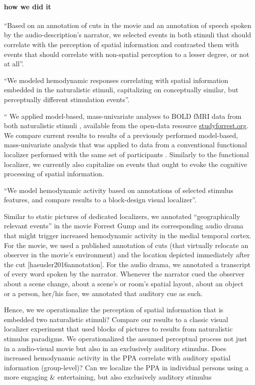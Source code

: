 \paragraph{how we did it}

%
``Based on an annotation of cuts in the movie and an annotation of speech spoken
by the audio-description's narrator, we selected events in both stimuli that
should correlate with the perception of spatial information and contrasted them
with events that should correlate with non-spatial perception to a lesser
degree, or not at all''.

``We modeled hemodynamic responses correlating with spatial information embedded
in the naturalistic stimuli, capitalizing on conceptually similar, but
perceptually different stimulation events''.

``%
We applied model-based, mass-univariate analyses to BOLD fMRI data from both
naturalistic stimuli \citep{hanke2016simultaneous, hanke2014audiomovie},
available from the open-data resource
\href{http://www.studyforrest.org}{studyforrest.org}.
We compare current results to results of a previously performed model-based,
mass-univariate analysis that was applied to data from a conventional functional
localizer performed with the same set of participants
\citep{sengupta2016extension}.
Similarly to the functional localizer, we currently also capitalize on events
that ought to evoke the cognitive processing of spatial information.

``We model hemodynamic activity based on annotations of selected stimulus
features,
and compare results to a block-design visual localizer''.

Similar to static pictures of dedicated localizers, we annotated “geographically
relevant events” in the movie Forrest Gump and its corresponding audio drama
that might trigger increased hemodynamic activity in the medial temporal cortex.
%
For the movie, we used a published annotation of cuts (that virtually relocate
an observer in the movie’s environment) and the location depicted immediately
after the cut [haeusler2016annotation].
%
For the audio drama, we annotated a transcript of every word spoken by the
narrator. Whenever the narrator cued the observer about a scene change, about a
scene’s or room’s spatial layout, about an object or a person, her/his face, we
annotated that auditory cue as such.



%
Hence, we we operationalize the perception of spatial information that is
embedded two naturalistic stimuli?
%
Compare our results to a classic visual localizer experiment that used blocks of
pictures to results from naturalistic stimulus paradigms.
%
We operationalized the assumed perceptual process not just in a
audio-visual movie but also in an exclusively auditory stimulus.
Does increased hemodynamic activity in the PPA correlate with auditory spatial
information (group-level)?
Can we localize the PPA in individual persons using a more engaging \&
entertaining, but also exclusively auditory stimulus


